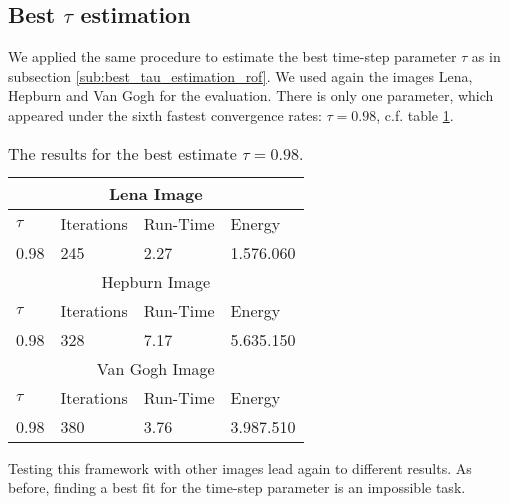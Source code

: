 
        \subsection{Best $\tau$ estimation} %
        \label{sub:best_tau_estimation_tvl1}
            
            We applied the same procedure to estimate the best time-step parameter $\tau$ as in subsection \ref{sub:best_tau_estimation_rof}. We used again the images Lena, Hepburn and Van Gogh for the evaluation. There is only one parameter, which appeared under the sixth fastest convergence rates: $\tau = 0.98$, c.f. table \ref{tab:best_tau_compare_tvl1}.

            \begin{table}
                \parbox{\linewidth}{
                \centering
                    \begin{tabular}{| l | l | l | l |}
                        \hline
                        \multicolumn{4}{|c|}{Lena Image} \\ \hline\hline
                        $\tau$ & Iterations & Run-Time & Energy \\ \hline
                        0.98 & 245 & 2.27 & 1.576.060 \\ \hline
                        \multicolumn{4}{|c|}{Hepburn Image} \\ \hline\hline
                        $\tau$ & Iterations & Run-Time & Energy \\ \hline
                        0.98 & 328 & 7.17 & 5.635.150 \\ \hline
                        \multicolumn{4}{|c|}{Van Gogh Image} \\ \hline\hline
                        $\tau$ & Iterations & Run-Time & Energy \\ \hline
                        0.98 & 380 & 3.76 & 3.987.510 \\ \hline
                    \end{tabular}
                }
                \caption[My table caption for TVL1 and tau.]{The results for the best estimate $\tau = 0.98$.}
                \label{tab:best_tau_compare_tvl1}
            \end{table}


        Testing this framework with other images lead again to different results. As before, finding a best fit for the time-step parameter is an impossible task.
    
